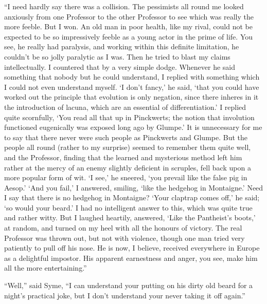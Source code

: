 “I need hardly say there was a collision. The pessimists all round me looked anxiously from one Professor to the other Professor to see which was really the more feeble. But I won. An old man in poor health, like my rival, could not be expected to be so impressively feeble as a young actor in the prime of life. You see, he really had paralysis, and working within this definite limitation, he couldn’t be so jolly paralytic as I was. Then he tried to blast my claims intellectually. I countered that by a very simple dodge. Whenever he said something that nobody but he could understand, I replied with something which I could not even understand myself. ‘I don’t fancy,’ he said, ‘that you could have worked out the principle that evolution is only negation, since there inheres in it the introduction of lacuna, which are an essential of differentiation.’ I replied quite scornfully, ‘You read all that up in Pinckwerts; the notion that involution functioned eugenically was exposed long ago by Glumpe.’ It is unnecessary for me to say that there never were such people as Pinckwerts and Glumpe. But the people all round (rather to my surprise) seemed to remember them quite well, and the Professor, finding that the learned and mysterious method left him rather at the mercy of an enemy slightly deficient in scruples, fell back upon a more popular form of wit. ‘I see,’ he sneered, ‘you prevail like the false pig in Aesop.’ ‘And you fail,’ I answered, smiling, ‘like the hedgehog in Montaigne.’ Need I say that there is no hedgehog in Montaigne? ‘Your claptrap comes off,’ he said; ‘so would your beard.’ I had no intelligent answer to this, which was quite true and rather witty. But I laughed heartily, answered, ‘Like the Pantheist’s boots,’ at random, and turned on my heel with all the honours of victory. The real Professor was thrown out, but not with violence, though one man tried very patiently to pull off his nose. He is now, I believe, received everywhere in Europe as a delightful impostor. His apparent earnestness and anger, you see, make him all the more entertaining.”

“Well,” said Syme, “I can understand your putting on his dirty old beard for a night’s practical joke, but I don’t understand your never taking it off again.”

